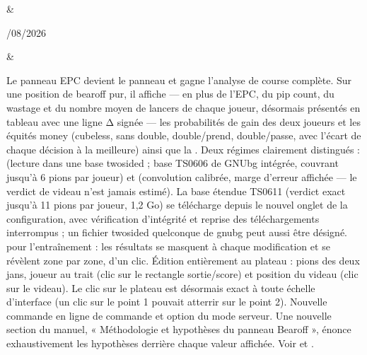 \documentclass[letterpaper,10pt,french]{sphinxmanual}
\begin{document}
\begin{savenotes}
\begin{longtable}{}
\begin{varwidth}[t]{}
\sphinxbeforeendvarwidth
\end{varwidth}%
&\begin{varwidth}[t]{}
/08/2026
\sphinxbeforeendvarwidth
\end{varwidth}%
&\begin{varwidth}[t]{}
\sphinxAtStartPar
Le panneau EPC devient le panneau  et gagne l’analyse de course complète. Sur une position de bearoff pur, il affiche — en plus de l’EPC, du pip count, du wastage et du nombre moyen de lancers de chaque joueur, désormais présentés en tableau avec une ligne Δ signée — les probabilités de gain des deux joueurs et les équités money (cubeless, sans double, double/prend, double/passe, avec l’écart de chaque décision à la meilleure) ainsi que la . Deux régimes clairement distingués :  (lecture dans une base two\sphinxhyphen{}sided ; base TS\sphinxhyphen{}06\sphinxhyphen{}06 de GNUbg intégrée, couvrant jusqu’à 6 pions par joueur) et  (convolution calibrée, marge d’erreur affichée — le verdict de videau n’est jamais estimé). La base étendue TS\sphinxhyphen{}06\sphinxhyphen{}11 (verdict exact jusqu’à 11 pions par joueur, 1,2 Go) se télécharge depuis le nouvel onglet  de la configuration, avec vérification d’intégrité et reprise des téléchargements interrompus ; un fichier  two\sphinxhyphen{}sided quelconque de gnubg peut aussi être désigné.  pour l’entraînement : les résultats se masquent à chaque modification et se révèlent zone par zone, d’un clic. Édition entièrement au plateau : pions des deux jans, joueur au trait (clic sur le rectangle sortie/score) et position du videau (clic sur le videau). Le clic sur le plateau est désormais exact à toute échelle d’interface (un clic sur le point 1 pouvait atterrir sur le point 2). Nouvelle commande  en ligne de commande et option  du mode serveur. Une nouvelle section du manuel, « Méthodologie et hypothèses du panneau Bearoff », énonce exhaustivement les hypothèses derrière chaque valeur affichée. Voir {\hyperref[\detokenize{manuel:panneau-epc}]{}} et {\hyperref[\detokenize{manuel:epc-methodologie}]{}}.
\sphinxbeforeendvarwidth
\end{varwidth}%
\\
\sphinxbottomrule
\end{longtable}
\sphinxtableafterendhook
\sphinxatlongtableend
\end{savenotes}
\end{document}
